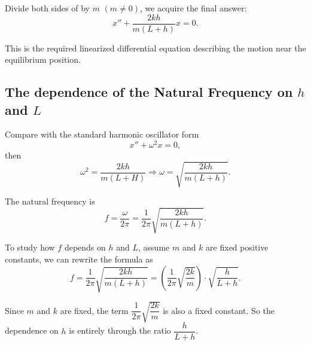 \documentclass[12pt, a4paper]{report}
\renewcommand{\eqref}[1]{\originaleqref{#1}}
\begin{document}
	Divide both sides of \eqref{eq:problem2:answer} by $m$ $(m \ne 0)$, we acquire the final answer:
	\begin{equation*}
		\boxed{x'' + \dfrac{2kh}{m(L + h)}x = 0.}
	\end{equation*}
	
	This is the required linearized differential equation describing the motion near the equilibrium position.
	
	\subsection{The dependence of the Natural Frequency on $h$ and $L$}
	Compare with the standard harmonic oscillator form \cite{harmonic_oscialltor}
	\begin{equation*}
		x'' + \omega^2 x = 0,
	\end{equation*}
	then
	\begin{equation*}
		\omega^2 = \dfrac{2kh}{m(L + H)} \Rightarrow \omega = \sqrt{\dfrac{2kh}{m(L + h)}}.
	\end{equation*}
	
	The natural frequency is
	\begin{equation}
		\boxed{f = \dfrac{\omega}{2\pi} = \dfrac{1}{2\pi} \sqrt{\dfrac{2kh}{m(L + h)}}.}
	\end{equation}
	
	To study how $f$ depends on $h$ and $L$, assume $m$ and $k$ are fixed positive constants, we can rewrite the formula as
	\begin{equation}
		f = \dfrac{1}{2\pi} \sqrt{\dfrac{2kh}{m(L + h)}} = \left(\dfrac{1}{2\pi} \sqrt{\dfrac{2k}{m}}\right) \cdot \sqrt{\dfrac{h}{L + h}}. \label{eq:problem2:frequency_grouped}
	\end{equation}
	
	Since $m$ and $k$ are fixed, the term $\dfrac{1}{2\pi} \sqrt{\dfrac{2k}{m}}$ is also a fixed constant. So the dependence on $h$ is entirely through the ratio $\dfrac{h}{L + h}$.
	
\end{document}
